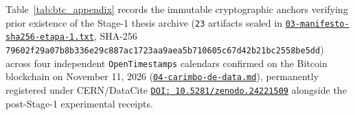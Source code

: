 \documentclass[10pt,a4paper]{article}
\begin{document}
Table~\ref{tab:btc_appendix} records the immutable cryptographic anchors verifying prior existence of the Stage-1 thesis archive (\texttt{23} artifacts sealed in \href{https://drive.google.com/file/d/1PSdXe2teIQpBW0tJpxE8yiLiP2Wo1AiF/view?usp=drivesdk}{\texttt{03-manifesto-sha256-etapa-1.txt}}, SHA-256 \texttt{79602f29\allowbreak{}a07b8b33\allowbreak{}6e29c887\allowbreak{}ac1723aa\allowbreak{}9aea5b71\allowbreak{}0605c67d\allowbreak{}42b21bc2\allowbreak{}558be5dd}) across four independent \texttt{OpenTimestamps} calendars confirmed on the Bitcoin blockchain on November 11, 2026 (\href{https://drive.google.com/file/d/1OwjPlXRdBPydtqypoRHNfByfMSmx-Bwb/view?usp=drivesdk}{\texttt{04-carimbo-de-data.md}}), permanently registered under CERN/DataCite \href{https://doi.org/10.5281/zenodo.24221509}{\texttt{DOI:\,10.5281/zenodo.24221509}} alongside the post-Stage-1 experimental receipts.
\end{document}
